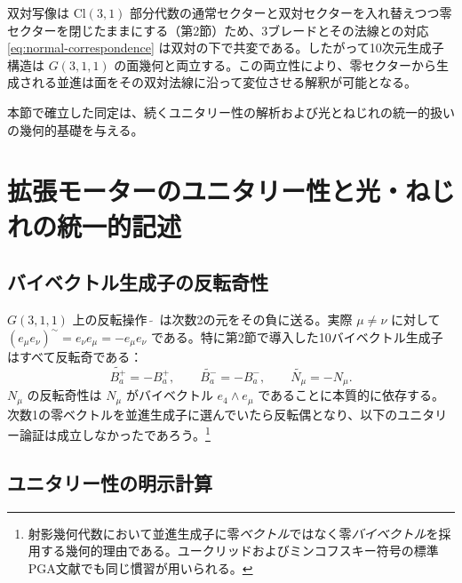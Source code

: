 \documentclass[11pt,a4paper]{article}
\begin{document}
双対写像は $\mathrm{Cl}(3,1)$ 部分代数の通常セクターと双対セクターを入れ替えつつ零セクターを閉じたままにする（第2節）ため、3ブレードとその法線との対応 \eqref{eq:normal-correspondence} は双対の下で共変である。したがって10次元生成子構造は $G(3,1,1)$ の面幾何と両立する。この両立性により、零セクターから生成される並進は面をその双対法線に沿って変位させる解釈が可能となる。

本節で確立した同定は、続くユニタリー性の解析および光とねじれの統一的扱いの幾何的基礎を与える。

\section{拡張モーターのユニタリー性と光・ねじれの統一的記述}

\subsection{バイベクトル生成子の反転奇性}

$G(3,1,1)$ 上の反転操作 $\,\tilde{}\,$ は次数2の元をその負に送る。実際 $\mu\neq\nu$ に対して $(e_{\mu}e_{\nu})^{\sim} = e_{\nu}e_{\mu} = -e_{\mu}e_{\nu}$ である。特に第2節で導入した10バイベクトル生成子はすべて反転奇である：
\begin{equation}
\widetilde{B_{a}^{+}} = -B_{a}^{+},\qquad
\widetilde{B_{a}^{-}} = -B_{a}^{-},\qquad
\widetilde{N_{\mu}}   = -N_{\mu}.
\label{eq:rev-odd}
\end{equation}
$N_{\mu}$ の反転奇性は $N_{\mu}$ がバイベクトル $e_{4}\wedge e_{\mu}$ であることに本質的に依存する。次数1の零ベクトルを並進生成子に選んでいたら反転偶となり、以下のユニタリー論証は成立しなかったであろう。\footnote{射影幾何代数において並進生成子に零\emph{ベクトル}ではなく零\emph{バイベクトル}を採用する幾何的理由である。ユークリッドおよびミンコフスキー符号の標準PGA文献でも同じ慣習が用いられる。}

\subsection{ユニタリー性の明示計算}
\end{document}
